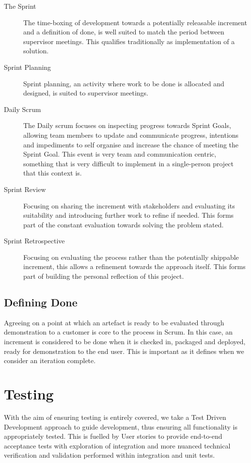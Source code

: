 \begin{description}
	\item[The Sprint] The time-boxing of development towards a potentially releasable increment and a definition of done, is well suited to match the period between supervisor meetings. This qualifies traditionally as implementation of a solution.
	
	\item[Sprint Planning] Sprint planning, an activity where work to be done is allocated and designed, is suited to supervisor meetings. 
	
	\item[Daily Scrum] The Daily scrum focuses on inspecting progress towards Sprint Goals, allowing team members to update and communicate progress, intentions and impediments to self organise and increase the chance of meeting the Sprint Goal. This event is very team and communication centric, something that is very difficult to implement in a single-person project that this context is.
	
	\item[Sprint Review] Focusing on sharing the increment with stakeholders and evaluating its suitability and introducing further work to refine if needed. This forms part of the constant evaluation towards solving the problem stated. 
	
	\item[Sprint Retrospective] Focusing on evaluating the process rather than the potentially shippable increment, this allows a refinement towards the approach itself. This forms part of building the personal reflection of this project.
	
\end{description}

\subsection{Defining Done}

Agreeing on a point at which an artefact is ready to be evaluated through demonstration to a customer is core to the process in Scrum. In this case, an increment is considered to be done when it is checked in, packaged and deployed, ready for demonstration to the end user. This is important as it defines when we consider an iteration complete.

\newpage
\section{Testing}

With the aim of ensuring testing is entirely covered, we take a Test Driven Development approach to guide development, thus ensuring all functionality is appropriately tested. This is fuelled by User stories to provide end-to-end acceptance tests with exploration of integration and more nuanced technical verification and validation performed within integration and unit tests.
